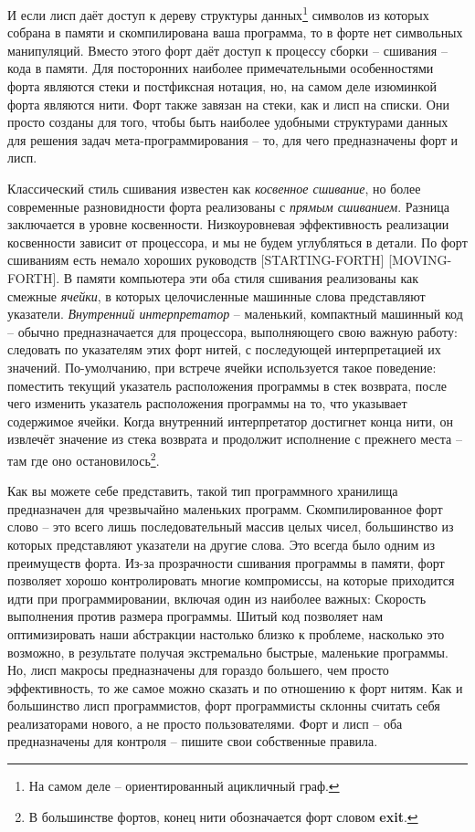 И если лисп даёт доступ к дереву структуры данных\footnote{На самом деле -- ориентированный ацикличный граф.} символов из которых собрана в памяти и скомпилирована ваша программа, то в форте нет символьных манипуляций. Вместо этого форт даёт доступ к процессу сборки -- сшивания -- кода в памяти. Для посторонних наиболее примечательными особенностями форта являются стеки и постфиксная нотация, но, на самом деле изюминкой форта являются нити. Форт также завязан на стеки, как и лисп на списки. Они просто созданы для того, чтобы быть наиболее удобными структурами данных для решения задач мета-программирования -- то, для чего предназначены форт и лисп.

Классический стиль сшивания известен как \emph{косвенное сшивание}, но более современные разновидности форта реализованы с \emph{прямым сшиванием}. Разница заключается в уровне косвенности. Низкоуровневая эффективность реализации косвенности зависит от процессора, и мы не будем углубляться в детали. По форт сшиваниям есть немало хороших руководств [STARTING-FORTH] [MOVING-FORTH]. В памяти компьютера эти оба стиля сшивания реализованы как смежные \emph{ячейки}, в которых целочисленные машинные слова представляют указатели. \emph{Внутренний интерпретатор} -- маленький, компактный машинный код -- обычно предназначается для процессора, выполняющего свою важную работу: следовать по указателям этих форт нитей, с последующей интерпретацией их значений. По-умолчанию, при встрече ячейки используется такое поведение: поместить текущий указатель расположения программы в стек возврата, после чего изменить указатель расположения программы на то, что указывает содержимое ячейки. Когда внутренний интерпретатор достигнет конца нити, он извлечёт значение из стека возврата и продолжит исполнение с прежнего места -- там где оно остановилось\footnote{В большинстве фортов, конец нити обозначается форт словом \textbf{exit}.}.

Как вы можете себе представить, такой тип программного хранилища предназначен для чрезвычайно маленьких программ. Скомпилированное форт слово -- это всего лишь последовательный массив целых чисел, большинство из которых представляют указатели на другие слова. Это всегда было одним из преимуществ форта. Из-за прозрачности сшивания программы в памяти, форт позволяет хорошо контролировать многие компромиссы, на которые приходится идти при программировании, включая один из наиболее важных: Скорость выполнения против размера программы. Шитый код позволяет нам оптимизировать наши абстракции настолько близко к проблеме, насколько это возможно, в результате получая экстремально быстрые, маленькие программы. Но, лисп макросы предназначены для гораздо большего, чем просто эффективность, то же самое можно сказать и по отношению к форт нитям. Как и большинство лисп программистов, форт программисты склонны считать себя реализаторами нового, а не просто пользователями. Форт и лисп -- оба предназначены для контроля -- пишите свои собственные правила.

